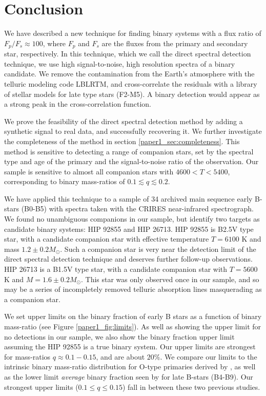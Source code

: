 \section{Conclusion}
\label{paper1_sec:conclusions}
We have described a new technique for finding binary systems with a
flux ratio of $F_p/F_s \approx 100$, where $F_p$ and $F_s$ are
the fluxes from the primary and secondary star, respectively. In this
technique, which we call the direct spectral detection technique, we
use high signal-to-noise, high resolution spectra of a binary candidate.
We remove the contamination from the Earth's atmosphere with the telluric 
modeling code LBLRTM, and cross-correlate the residuals with a library of stellar 
models for late type stars (F2-M5). A binary detection would appear as a strong 
peak in the cross-correlation function.

We prove the feasibility of the direct spectral detection method by
adding a synthetic signal to real data, and successfully recovering
it. We further investigate the completeness of the method in section \ref{paper1_sec:completeness}. This method is sensitive to detecting a range of companion stars, set by the spectral type and age of the primary and the signal-to-noise ratio of the observation. Our sample is sensitive to almost all companion stars with $4600 < T < 5400$, corresponding to binary mass-ratios of $0.1 \lesssim q \lesssim 0.2$.

 We have applied this technique to a sample of 34 archived main sequence 
early B-stars (B0-B5) with spectra taken with the CRIRES near-infrared
spectrograph. We found no unambiguous companions in our sample, but identify two targets as candidate binary systems: HIP 92855 and HIP 26713. HIP 92855 is B2.5V type star, with a candidate companion star with effective temperature $T = 6100$ K and mass $1.2 \pm 0.2 M_{\odot}$. Such a companion star is very near the detection limit of the direct spectral detection technique and deserves further follow-up observations. HIP 26713 is a B1.5V type star, with a candidate companion star with $T = 5600$ K and $M = 1.6 \pm 0.2 M_{\odot}$. This star was only observed once in our sample, and so may be a series of incompletely removed telluric absorption lines masquerading as a companion star.

We set upper limits on the binary fraction of early B stars as a function of binary mass-ratio (see Figure \ref{paper1_fig:limits}). As well as showing the upper limit for no detections in our sample, we also show the binary fraction upper limit assuming the HIP 92855 is a true binary system.  Our upper limits are strongest for mass-ratios $q \approx 0.1 - 0.15$, and are
about $20\%$. We compare our limits to the intrinsic binary mass-ratio distribution for O-type primaries derived by \cite{Sana2012}, as well as the lower limit \emph{average} binary fraction seen by \cite{Evans2011} for late B-stars (B4-B9). Our strongest upper limits ($0.1 \leq q \leq 0.15$) fall in between these two previous studies.

